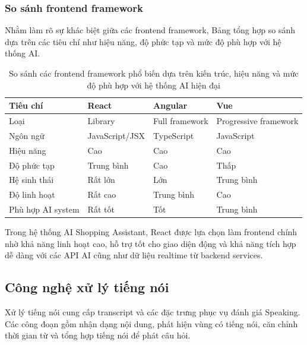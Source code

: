 \subsubsection{So sánh frontend framework}

Nhằm làm rõ sự khác biệt giữa các frontend framework, Bảng  tổng hợp so sánh dựa trên các tiêu chí như hiệu năng, độ phức tạp và mức độ phù hợp với hệ thống AI.

\begin{table}[H]
\centering
\caption{So sánh các frontend framework phổ biến dựa trên kiến trúc, hiệu năng và mức độ phù hợp với hệ thống AI hiện đại}
\label{tab:frontend_framework_comparison}
\renewcommand{\arraystretch}{1.3}

\begin{tabularx}{\linewidth}{|>{\raggedright\arraybackslash}X|>{\raggedright\arraybackslash}X|>{\raggedright\arraybackslash}X|>{\raggedright\arraybackslash}X|}
\hline
\textbf{Tiêu chí} & \textbf{React} & \textbf{Angular} & \textbf{Vue} \\ \hline
Loại & Library & Full framework & Progressive framework \\ \hline
Ngôn ngữ & JavaScript/JSX & TypeScript & JavaScript \\ \hline
Hiệu năng & Cao & Cao & Cao \\ \hline
Độ phức tạp & Trung bình & Cao & Thấp \\ \hline
Hệ sinh thái & Rất lớn & Lớn & Trung bình \\ \hline
Độ linh hoạt & Rất cao & Trung bình & Cao \\ \hline
Phù hợp AI system & Rất tốt & Tốt & Trung bình \\ \hline
\end{tabularx}
\end{table}

Trong hệ thống AI Shopping Assistant, React được lựa chọn làm frontend chính nhờ khả năng linh hoạt cao, hỗ trợ tốt cho giao diện động và khả năng tích hợp dễ dàng với các API AI cũng như dữ liệu realtime từ backend services.
\subsection{Công nghệ xử lý tiếng nói}

Xử lý tiếng nói cung cấp transcript và các đặc trưng phục vụ đánh giá Speaking. Các công đoạn gồm nhận dạng nội dung, phát hiện vùng có tiếng nói, căn chỉnh thời gian từ và tổng hợp tiếng nói để phát câu hỏi.

